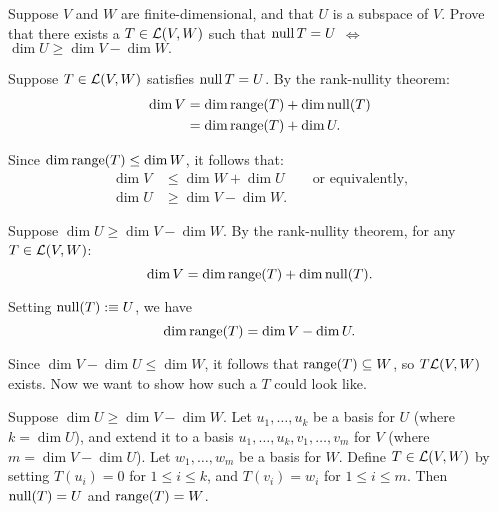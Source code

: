 \begin{xrcs}
  Suppose $V$ and $W$ are finite-dimensional, and that $U$ is a subspace of $V$. Prove that there exists a $T \in \mathcal{L}(V,W)$ such that $\operatorname{null} T = U$
  $\iff$ $\dim U \geq \dim V - \dim W.$
\end{xrcs}
\begin{prf}
  \Rightarrowdirection Suppose $T \in \mathcal{L}(V,W)$ satisfies $\operatorname{null} T = U$. By the rank-nullity theorem:
  \begin{equation}
    \begin{aligned}
      \dim V &= \dim \operatorname{range}(T) + \dim \operatorname{null}(T) \\
             &= \dim \operatorname{range}(T) + \dim U.
    \end{aligned}
  \end{equation}

  Since $\dim \operatorname{range}(T) \leq \dim W$, it follows that:
  \begin{equation}
    \begin{aligned}
      \dim V &\leq \dim W + \dim U \qquad \text{or equivalently,}  \\
      \dim U &\geq \dim V - \dim W.
    \end{aligned}
  \end{equation}

  \Leftarrowdirection Suppose $\dim U \geq \dim V - \dim W$. By the rank-nullity theorem, for any $T \in \mathcal{L}(V,W)$:
  \begin{equation}
    \dim V = \dim \operatorname{range}(T) + \dim \operatorname{null}(T).
  \end{equation}

  Setting $\operatorname{null}(T) :\equiv U$, we have
  \begin{equation}
    \dim \operatorname{range}(T) = \dim V - \dim U.
  \end{equation}

  Since $\dim V - \dim U \leq \dim W$, it follows that $\operatorname{range}(T) \subseteq W$, so $T\mathcal{L} (V,W)$ exists. Now we want to show how such a $T$ could look like.

  Suppose $\dim U \geq \dim V - \dim W$. Let $u_1, \dots, u_k$ be a basis for $U$ (where $k = \dim U$), and extend it to a basis $u_1, \dots, u_k, v_1, \dots, v_m$ for $V$ (where $m = \dim V - \dim U$). Let $w_1, \dots, w_m$ be a basis for $W$. Define $T \in \mathcal{L}(V,W)$ by setting $T(u_i) = 0$ for $1 \leq i \leq k$, and $T(v_i) = w_i$ for $1 \leq i \leq m$. Then $\operatorname{null}(T) = U$ and $\operatorname{range}(T) = W$.
\end{prf}

